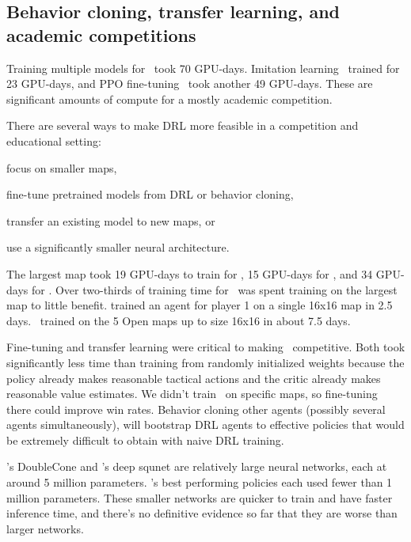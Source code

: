 \documentclass[conference]{IEEEtran}
\begin{document}
\subsection{Behavior cloning, transfer learning, and academic competitions}
Training multiple models for \agentName\ took 70 GPU-days. Imitation learning \bcAgent\
trained for 23 GPU-days, and PPO fine-tuning \bcPPOAgent\ took another 49 GPU-days. 
These are significant amounts of compute for a mostly academic competition.

There are several ways to make DRL more feasible in a competition and educational setting:
\begin{inparaenum}[(1)]
    \item focus on smaller maps,
    \item fine-tune pretrained models from DRL or behavior cloning,
    \item transfer an existing model to new maps, or
    \item use a significantly smaller neural architecture.
\end{inparaenum}
The largest map took 19 GPU-days to train for \agentName, 15 GPU-days for \bcAgent, and
34 GPU-days for \bcPPOAgent. Over two-thirds of training time for \bcPPOAgent\ was spent
training on the largest map to little benefit. \cite{DBLP:journals/corr/abs-2105-13807}
trained an agent for player 1 on a single 16x16 map in 2.5 days. \bcPPOAgent\ trained
on the 5 Open maps up to size 16x16 in about 7.5 days.

Fine-tuning and transfer learning were critical to making \agentName\ competitive. Both
took significantly less time than training from randomly initialized weights because the
policy already makes reasonable tactical actions and the critic already makes reasonable
value estimates. We didn't train
\bcPPOAgent\ on specific maps, so fine-tuning there could improve win rates. Behavior
cloning other agents (possibly several agents simultaneously), will bootstrap DRL agents
to effective policies that would be extremely difficult to obtain with naive DRL
training.

\agentName's DoubleCone and \bcPPOAgent's deep squnet are relatively large neural
networks, each at around 5 million parameters.
\cite{DBLP:journals/corr/abs-2105-13807}'s best performing policies each used fewer
than 1 million parameters. These smaller networks are quicker to train and have faster
inference time, and there's no definitive evidence so far that they are worse than
larger networks.
\end{document}
